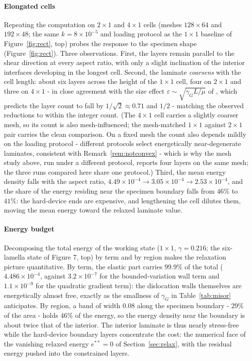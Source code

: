 \documentclass[12pt]{article}
\theoremstyle{plain}
\theoremstyle{definition}
\begin{document}
\paragraph{Elongated cells}
Repeating the computation on $2\times1$ and $4\times1$ cells (meshes
$128\times64$ and $192\times48$; the same $k=8\times10^{-5}$ and loading
protocol as the $1\times1$ baseline of Figure~\ref{fig:rect}, top) probes the
response to the specimen shape (Figure~\ref{fig:rect}). Three observations. First, the
layers remain parallel to the shear direction at every aspect ratio, with only a
slight inclination of the interior interfaces developing in the longest cell.
Second, the laminate \emph{coarsens} with the cell length: about six layers
across the height of the $1\times1$ cell, four on $2\times1$ and three on
$4\times1$ - in close agreement with the size effect
$\varepsilon\sim\sqrt{\gamma_G L/\mu}$ of \citet{koster2015bformation}, which predicts the layer count to fall by $1/\sqrt2\approx0.71$ and $1/2$ - matching the
observed reductions to within the integer count. (The $4\times1$ cell carries a
slightly coarser mesh, so its count is also mesh-influenced; the mesh-matched
$1\times1$ against $2\times1$ pair carries the clean comparison. On a fixed mesh
the count also depends mildly on the loading protocol - different protocols
select energetically near-degenerate laminates, consistent with
Remark~\ref{rem:notconvex} - which is why the mesh study above, run under a
different protocol, reports four layers on the same mesh; the three runs
compared here share one protocol.) Third, the mean energy density
falls with the aspect ratio, $4.49\times10^{-4}\to3.05\times10^{-4}\to
2.53\times10^{-4}$, and the share of the energy residing near the specimen
boundary falls from $46\%$ to $41\%$: the hard-device ends are expensive, and
lengthening the cell dilutes them, moving the mean energy toward the relaxed
laminate value.

\paragraph{Energy budget}
Decomposing the total energy of the working state ($1\times1$, $\gamma=0.216$; the six-lamella state of Figure 7, top)
by term and by region makes the relaxation picture quantitative. By term, the
elastic part carries $99.9\%$ of the total ($4.486\times10^{-4}$, against
$3.2\times10^{-7}$ for the bounded-variation wall term and $1.1\times10^{-9}$ for
the quadratic gradient term): the dislocation walls themselves are energetically
almost free, exactly as the smallness of $\gamma_G$ in Table~\ref{tab:misor}
anticipates. By region, a band of width $0.08$ along the specimen boundary -
$29\%$ of the area - holds $46\%$ of the energy, so the energy density near the
boundary is about twice that of the interior. The interior laminate is thus
nearly stress-free while the hard-device boundary layers concentrate the cost:
the numerical face of the vanishing relaxed energy $e^{\ast\ast}=0$ of
Section~\ref{sec:relax}, with the residual energy pushed into the constrained
layers.
\end{document}
